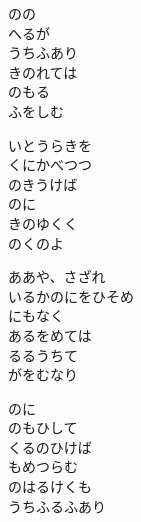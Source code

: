 \documentclass[10pt,b5j]{tarticle} %
\begin{document}
\vspace{1.5em} %
\newcommand{\linespace}{0.5em} %
\newcommand{\blocksize}{0.5\hsize} %
\begin{enumerate} %
    \begin{minipage}[c]{\blocksize}
    
        \vspace{\linespace}
        \item
        のの\\
        へるが\\
        うちふあり\\
        きのれては\\
        のもる\\
        ふをしむ
        
        \vspace{\linespace}
        \item
        いとうらきを\\
        くにかべつつ\\
        のきうけば\\
        のに\\
        きのゆくく\\
        のくのよ
        
        \vspace{\linespace}
        \item
        ああや、さざれ\\
        いるかのにをひそめ\\
        にもなく\\
        あるをめては\\
        るるうちて\\
        がをむなり
        
        \vspace{\linespace}
        \item
        のに\\
        のもひして\\
        くるのひけば\\
        もめつらむ\\
        のはるけくも\\
        うちふるふあり
        

\end{minipage}
\end{enumerate}
\end{document}
